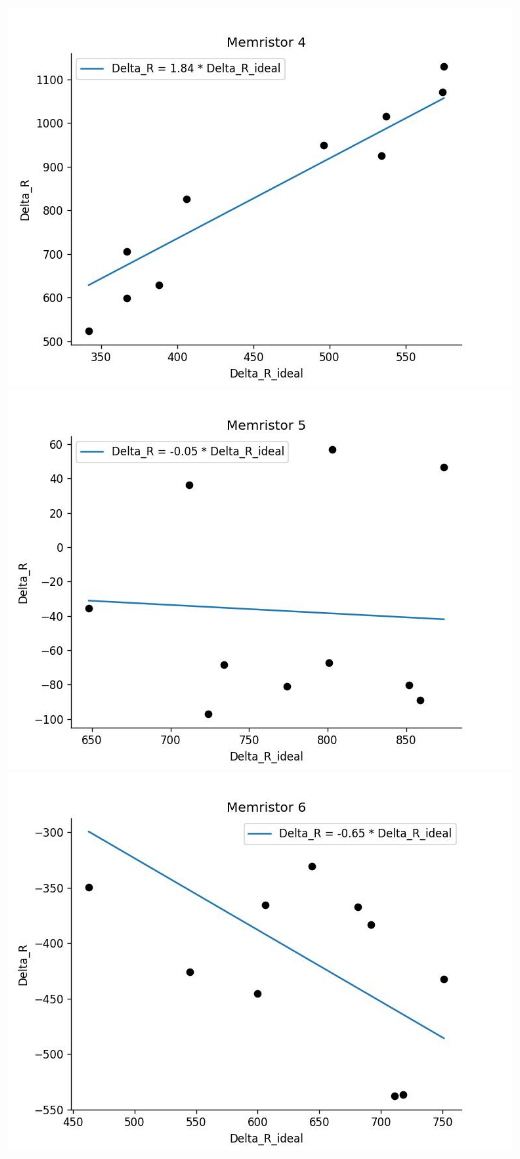     \includegraphics[width=\textwidth / 2]{code/plots/model_1_memristor_4}
    \includegraphics[width=\textwidth / 2]{code/plots/model_1_memristor_5}
    \includegraphics[width=\textwidth / 2]{code/plots/model_1_memristor_6}
